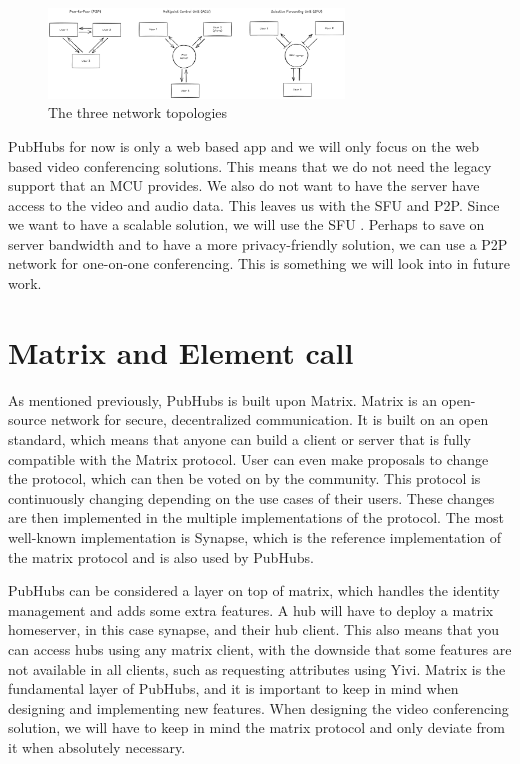 \documentclass{report}
\begin{document}
\begin{figure}[!hbt]
\centering
\includegraphics[width=0.7\textwidth]{img/thesisDPD}
\caption{The three network topologies}
\label{fig:three-options-video-conferencing}
\end{figure}

PubHubs for now is only a web based app and we will only focus on the web based video conferencing solutions. This means
that we do not need the legacy support that an MCU provides. We also do not want to have the server have access to the
video and audio data. This leaves us with the SFU and P2P. Since we want to have a scalable solution, we will use
the SFU .
Perhaps to save on server bandwidth and to have a more privacy-friendly solution, we can use a P2P network for one-on-one
conferencing. This is something we will look into in future work.

\section{Matrix and Element call}
\label{sec:matrix}
As mentioned previously, PubHubs is built upon Matrix. Matrix is an open-source network for secure, decentralized
communication. It is built on an open standard, which means that anyone can build a client or server that is fully
compatible with the Matrix protocol. User can even make proposals to change the protocol, which can then be voted on
by the community. This protocol is continuously changing depending on the use cases of their users. These changes
are then implemented in the multiple implementations of the protocol. The most well-known implementation is Synapse,
which is the reference implementation of the matrix protocol and is also used by PubHubs.

PubHubs can be considered a layer on top of matrix, which handles the identity management and adds some extra features.
A hub will have to deploy a matrix homeserver, in this case synapse, and their hub client. This also means that you can
access hubs using any matrix client, with the downside that some features are not available in all clients, such as
requesting attributes using Yivi. Matrix is the fundamental layer of PubHubs, and it is important to keep in mind
when designing and implementing new features. When designing the video conferencing solution, we will have to keep
in mind the matrix protocol and only deviate from it when absolutely necessary.
\end{document}
